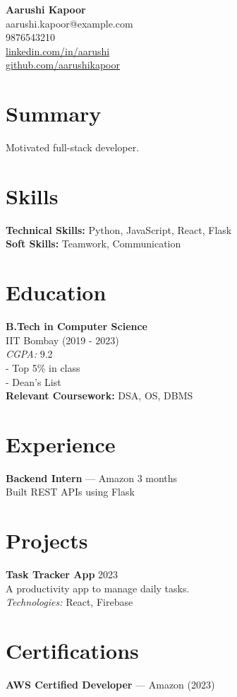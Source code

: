 \documentclass[10pt]{article}
\begin{document}
\begin{center}
{\LARGE \textbf{Aarushi Kapoor}} \\ 
aarushi.kapoor@example.com \\ 
9876543210 \\ 
\href{https://linkedin.com/in/aarushi}{linkedin.com/in/aarushi} \\ 
\href{https://github.com/aarushikapoor}{github.com/aarushikapoor}
\end{center}

\section*{Summary}
Motivated full-stack developer.
\section*{Skills}
\textbf{Technical Skills:} Python, JavaScript, React, Flask\\
\textbf{Soft Skills:} Teamwork, Communication
\section*{Education}
\textbf{B.Tech in Computer Science} \\IIT Bombay (2019 - 2023) \\\textit{CGPA:} 9.2 \\\quad - Top 5\% in class \\\quad - Dean’s List \\\textbf{Relevant Coursework:} DSA, OS, DBMS\\
\section*{Experience}
\textbf{Backend Intern} — Amazon \hfill 3 months \\Built REST APIs using Flask
\section*{Projects}
\textbf{Task Tracker App} \hfill 2023 \\A productivity app to manage daily tasks. \\\textit{Technologies:} React, Firebase \\
\section*{Certifications}
\textbf{AWS Certified Developer} — Amazon (2023) \\
\end{document}
